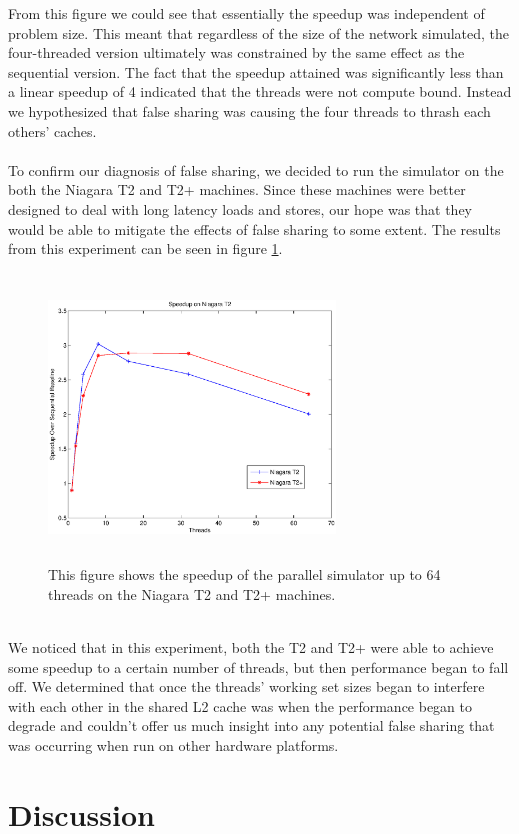 \documentclass[twocolumn]{article}
\begin{document}
From this figure we could see that essentially the speedup was independent
of problem size.  This meant that regardless of the size of the network
simulated, the four-threaded version ultimately was constrained by the
same effect as the sequential version.  The fact that the speedup
attained was significantly less than a linear speedup of 4 indicated that
the threads were not compute bound.  Instead we hypothesized that false
sharing was causing the four threads to thrash each others' caches.\\
~\\
To confirm our diagnosis of false sharing, we decided to run the simulator
on the both the Niagara T2 and T2+ machines.  Since these machines were
better designed to deal with long latency loads and stores, our hope was
that they would be able to mitigate the effects of false sharing to some
extent.  The results from this experiment can be seen in figure
\ref{niagara}.\\
\begin{figure}[h]
\centering
\includegraphics[height=3in,width=3in]{niagara.eps}
\caption{\label{niagara}This figure shows the speedup of the parallel simulator
up to 64 threads on the Niagara T2 and T2+ machines.}
\end{figure}
~\\
We noticed that in this experiment, both the T2 and T2+ were able to
achieve some speedup to a certain number of threads, but then performance
began to fall off.  We determined that once the threads' working set sizes
began to interfere with each other in the shared L2 cache was when the
performance began to degrade and couldn't offer us much insight into any potential false sharing that was occurring when run on other
hardware platforms.

\section{Discussion \label{disc}}

\end{document}
